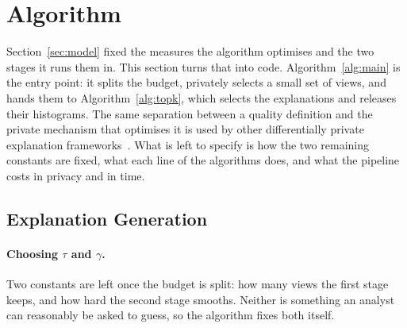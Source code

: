 
\section{Algorithm}\label{sec:solution}

Section~\ref{sec:model} fixed the measures the algorithm optimises and the two stages it runs them in.
This section turns that into code.
Algorithm~\ref{alg:main} is the entry point: it splits the budget, privately selects a small set of views, and hands them to Algorithm~\ref{alg:topk}, which selects the explanations and releases their histograms.
The same separation between a quality definition and the private mechanism that optimises it is used by other differentially private explanation frameworks~\cite{TaoGMR22}.
What is left to specify is how the two remaining constants are fixed, what each line of the algorithms does, and what the pipeline costs in privacy and in time.

\subsection{Explanation Generation}
\label{subsec:explanation-generation}
\paragraph{Choosing $\tau$ and $\gamma$.}
Two constants are left once the budget is split: how many views the first stage keeps, and how hard the second stage smooths.
Neither is something an analyst can reasonably be asked to guess, so the algorithm fixes both itself.

